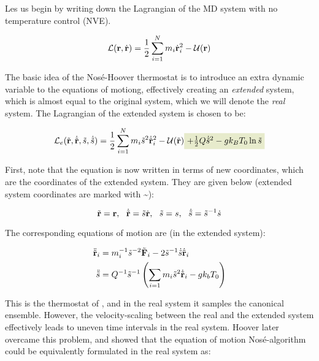Les us begin by writing down the Lagrangian of the MD system with no temperature control (NVE).

\begin{equation}
	\mathcal{L}(\mathbf{r}, \dot{\mathbf{r}}) = \frac{1}{2} \sum_{i=1}^N m_i \dot{\mathbf{r}}_i^2 - \mathcal{U(\mathbf{r})}
\end{equation}

The basic idea of the Nosé-Hoover thermostat is to introduce an extra dynamic variable to the equations of motiong, effectively creating an \emph{extended} system, which is almost equal to the original system, which we will denote the \emph{real} system. The Lagrangian of the extended system is chosen to be:


\begin{equation}
	\mathcal{L}_e(\tilde\rvec, \dot{\tilde\rvec}, \tilde{s}, \dot{\tilde s}) = \frac{1}{2}\sum_{i=1}^N m_i \tilde s^2 \dot{\tilde\rvec}_i^2 - \mathcal{U}(\tilde\rvec) 
	\tikz[baseline] {
		\node [fill=green!20, anchor=base] (t1) {$+ \frac{1}{2} Q \dot{\tilde s}^2 - gk_BT_0 \ln\tilde s $};
	}
\end{equation}


First, note that the equation is now written in terms of new coordinates, which are the coordinates of the extended system. They are given below (extended system coordinates are marked with \textasciitilde): 

\begin{equation}
	\tilde\rvec = \rvec, \ \ \dot{\tilde\rvec} = \tilde s \dot\rvec, \ \ \tilde s = s, \ \ \dot{\tilde s} = \tilde s^{-1} \dot{s}
\end{equation}

The corresponding equations of motion are (in the extended system):

\begin{align}
	\ddot{\tilde{\mathbf{r}}}_i & = m_i^{-1} \tilde s^{-2} \tilde{\mathbf{F}}_i - 2\tilde s^{-1} \dot{\tilde s} \dot{\tilde{\mathbf{r}}}_i \\
	\ddot{\tilde s} & =  Q^{-1} \tilde s^{-1} \left(\sum_{i=1}m_i\tilde s^2 \dot{\tilde{\mathbf{r}}}_i - gk_bT_0\right)
\end{align}

This is the thermostat of \citet{Nose1984}, and in the real system it samples the canonical ensemble. However, the velocity-scaling between the real and the extended system effectively leads to uneven time intervals in the real system. Hoover later overcame this problem, and showed that the equation of motion Nosé-algorithm could be equivalently formulated in the real system as:

